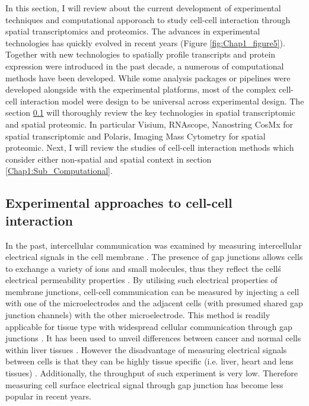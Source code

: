 In this section, I will review about the current development of experimental techniques and computational apporoach to study cell-cell interaction through spatial transcriptomics and proteomics. The advances in experimental technologies has quickly evolved in recent years (Figure \ref{fig:Chap1_figure5}). Together with new technologies to spatially profile transcripts and protein expression were introduced in the past decade, a numerous of computational methods have been developed. While some analysis packages or pipelines were developed alongside with the experimental platforms, most of the complex cell-cell interaction model were design to be universal across experimental design. The section \ref{Chap1:Sub_Spatial_Experiment_Platform} will thoroughly review the key technologies in spatial transcriptomic and spatial proteomic. In particular Visium, RNAscope, Nanostring CosMx for spatial transcriptomic and Polaris, Imaging Mass Cytometry for spatial proteomic. Next, I will review the studies of cell-cell interaction methods which consider either non-spatial and  spatial context in section \ref{Chap1:Sub_Computational}.                

\subsection{Experimental approaches to cell-cell interaction}
\label{Chap1:Sub_Spatial_Experiment_Platform}
In the past, intercellular communication was examined by measuring intercellular electrical signals in the cell membrane \cite{bennett1966physiology, loewenstein1967intercellular, de1982cell}. The presence of gap junctions allows cells to exchange a variety of ions and small molecules, thus they reflect the cell\'s electrical permeability properties \cite{penn1966ionic, bennett1966physiology,loewenstein1966permeability,loewenstein1974cellular}. By utilising such electrical properties of membrane junctions, cell-cell communication can be measured by injecting a cell with one of the microelectrodes and the adjacent cells (with presumed shared gap junction channels) with the other microelectrode. This method is readily applicable for tissue type with widespread cellular communication through gap junctions \cite{penn1966ionic}. It has been used to unveil differences between cancer and normal cells within liver tissues \cite{loewenstein1966intercellular, loewenstein1967intercellular}. However the disadvantage of measuring electrical signals between cells is that they can be highly tissue specific (i.e. liver, heart and lens tissues) \cite{gros1983comparative}. Additionally, the throughput of such experiment is very low. Therefore measuring cell surface electrical signal through gap junction has become less popular in recent years. 

